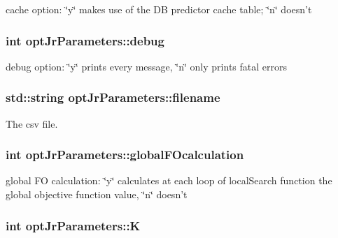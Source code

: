 cache option\-: \char`\"{}y\char`\"{} makes use of the D\-B predictor cache table; \char`\"{}n\char`\"{} doesn't 

\hypertarget{classoptJrParameters_aeac321db6ab6babd047c06696a260e90}{
\subsubsection[{debug}]{\setlength{\rightskip}{0pt plus 5cm}int opt\-Jr\-Parameters\-::debug\hspace{0.3cm}{\ttfamily [private]}}}\label{classoptJrParameters_aeac321db6ab6babd047c06696a260e90}


debug option\-: \char`\"{}y\char`\"{} prints every message, \char`\"{}n\char`\"{} only prints fatal errors 

\hypertarget{classoptJrParameters_a62fe03fe9f9484b54235a0dbe4c09736}{
\subsubsection[{filename}]{\setlength{\rightskip}{0pt plus 5cm}std\-::string opt\-Jr\-Parameters\-::filename\hspace{0.3cm}{\ttfamily [private]}}}\label{classoptJrParameters_a62fe03fe9f9484b54235a0dbe4c09736}


The csv file. 

\hypertarget{classoptJrParameters_ad00a4d00bc8b65f4323a1bd1383c632b}{
\subsubsection[{global\-F\-Ocalculation}]{\setlength{\rightskip}{0pt plus 5cm}int opt\-Jr\-Parameters\-::global\-F\-Ocalculation\hspace{0.3cm}{\ttfamily [private]}}}\label{classoptJrParameters_ad00a4d00bc8b65f4323a1bd1383c632b}


global F\-O calculation\-: \char`\"{}y\char`\"{} calculates at each loop of local\-Search function the global objective function value, \char`\"{}n\char`\"{} doesn't 

\hypertarget{classoptJrParameters_a8943dcfa48e368831ec28c9d1f5a953d}{
\subsubsection[{K}]{\setlength{\rightskip}{0pt plus 5cm}int opt\-Jr\-Parameters\-::\-K\hspace{0.3cm}{\ttfamily [private]}}}\label{classoptJrParameters_a8943dcfa48e368831ec28c9d1f5a953d}



